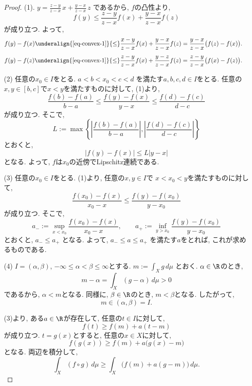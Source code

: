 \begin{proof}
(1).
\(
y
=
\frac{z-y}{z-x}\,x
+
\frac{y-x}{z-x}\,z
\)
であるから, $f$の凸性より,
\begin{equation}
\label{eq-convex-1}
f(y)
\leq
\frac{z-y}{z-x}f(x)
+
\frac{y-x}{z-x}f(z)
\end{equation}
が成り立つ.
よって,
\[
\begin{aligned}
f(y)-f(x)
&\underalign{\eqref{eq-convex-1}}{\leq}
\frac{x-y}{z-x}f(x)
+
\frac{y-x}{z-x}f(z)
=
\frac{y-x}{z-x}\bigl(f(z)-f(x)\bigr).
\end{aligned}
\]
\[
\begin{aligned}
f(y)-f(z)
&\underalign{\eqref{eq-convex-1}}{\leq}
\frac{z-y}{z-x}f(x)
+
\frac{y-z}{z-x}f(z)
=
\frac{z-y}{z-x}\bigl(f(x)-f(z)\bigr).
\end{aligned}
\]

(2) 任意の$x_0 \in I$をとる.
\(
a<b<x_0<c<d
\)
を満たす$a,b,c,d \in I$をとる.
任意の$x,y \in [b,c]$で$x<y$を満たすものに対して,
(1)より,
\[
\frac{f(b)-f(a)}{b-a}
\leq
\frac{f(y)-f(x)}{y-x}
\leq
\frac{f(d)-f(c)}{d-c}
\]
が成り立つ.
そこで,
\[
L:=
\max\left\{
\left|\frac{f(b)-f(a)}{b-a}\right|,
\left|\frac{f(d)-f(c)}{d-c}\right|
\right\}
\]
とおくと,
\[
|f(y)-f(x)| \leq L|y-x|
\]
となる.
よって, $f$は$x_0$の近傍でLipschitz連続である.

(3) 任意の$x_0 \in I$をとる.
(1)より, 任意の$x,y \in I$で
$x<x_0<y$を満たすものに対して,
\[
\frac{f(x_0)-f(x)}{x_0-x}
\leq
\frac{f(y)-f(x_0)}{y-x_0}
\]
が成り立つ.
そこで,
\[
a_-:=
\sup_{x<x_0}
\frac{f(x_0)-f(x)}{x_0-x},
\qquad
a_+:=
\inf_{y>x_0}
\frac{f(y)-f(x_0)}{y-x_0}
\]
とおくと,
\(
a_- \leq a_+
\)
となる.
よって,
\(
a_- \leq a \leq a_+
\)
を満たす$a$をとれば, これが求めるものである.


(4) $I=(\alpha,\beta)$,
$-\infty \leq \alpha<\beta \leq \infty$とする.
\(
m:=\int_X g\,d\mu
\)
とおく.
$\alpha \in \R$のとき,
\[
m-\alpha
=
\int_X (g-\alpha)\,d\mu
>0
\]
であるから, $\alpha<m$となる.
同様に, $\beta \in \R$のとき, $m<\beta$となる.
したがって,
\[
m \in (\alpha,\beta)=I.
\]

(3)より, ある$a \in \R$が存在して,
任意の$t \in I$に対して,
\[
f(t) \geq f(m)+a(t-m)
\]
が成り立つ.
$t=g(x)$とすると, 任意の$x \in X$に対して,
\[
f(g(x))
\geq
f(m)+a\bigl(g(x)-m\bigr)
\]
となる.
両辺を積分して,
\[
\int_X (f \circ g)\,d\mu
\geq
\int_X \bigl(f(m)+a(g-m)\bigr)\,d\mu.
\]

\end{proof}



